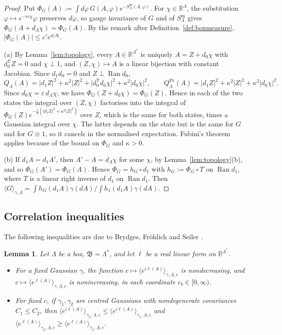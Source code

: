 \documentclass[11pt]{amsart}
\theoremstyle{plain}
\newtheorem{lemma}[theorem]{Lemma}
\theoremstyle{definition}
\theoremstyle{remark}
\numberwithin{equation}{section}
\newcommand{\R}{\mathbb{R}}
\newcommand{\eps}{\varepsilon}
\newcommand{\fB}{\mathfrak{B}}
\newcommand{\abs}[1]{\lvert #1\rvert}
\newcommand{\ev}[1]{\langle #1\rangle}
\newcommand{\Ran}{\operatorname{Ran}}
\begin{document}
\begin{proof}
Put $\Phi_G(A):=\int d\varphi\,G(A,\varphi)e^{-S^{\mathrm m}_\Lambda(A,\varphi)}$. For $\chi\in\R^\Lambda$, the substitution $\varphi\mapsto e^{-ie\chi}\varphi$ preserves $d\varphi$, so gauge invariance of $G$ and of $S^{\mathrm m}_\Lambda$ gives $\Phi_G(A+d_\Lambda\chi)=\Phi_G(A)$. By the remark after Definition~\ref{def:boxmeasure}, $\abs{\Phi_G(A)}\le c'e^{a\abs A}$.

(a) By Lemma~\ref{lem:topology}, every $A\in\R^{\Lambda^*}$ is uniquely $A=Z+d_0\chi$ with $d_0^{\mathsf T}Z=0$ and $\chi\perp1$, and $(Z,\chi)\mapsto A$ is a linear bijection with constant Jacobian. Since $d_1d_0=0$ and $Z\perp\Ran d_0$,
\[
Q_\Lambda(A)=\abs{d_1Z}^2+\kappa^2\abs Z^2+\abs{d_0^{\mathsf T}d_0\chi}^2+\kappa^2\abs{d_0\chi}^2,\qquad Q^{\mathrm{Pr}}_\Lambda(A)=\abs{d_1Z}^2+\kappa^2\abs Z^2+\kappa^2\abs{d_0\chi}^2 .
\]
Since $d_0\chi=\eps\,d_\Lambda\chi$, we have $\Phi_G(Z+d_0\chi)=\Phi_G(Z)$. Hence in each of the two states the integral over $(Z,\chi)$ factorises into the integral of $\Phi_G(Z)e^{-\frac\eps2(\abs{d_1Z}^2+\kappa^2\abs Z^2)}$ over $Z$, which is the same for both states, times a Gaussian integral over $\chi$. The latter depends on the state but is the same for $G$ and for $G\equiv1$, so it cancels in the normalised expectation. Fubini's theorem applies because of the bound on $\Phi_G$ and $\kappa>0$.

(b) If $d_1A=d_1A'$, then $A'-A=d_\Lambda\chi$ for some $\chi$, by Lemma~\ref{lem:topology}(b), and so $\Phi_G(A')=\Phi_G(A)$. Hence $\Phi_G=h_G\circ d_1$ with $h_G:=\Phi_G\circ T$ on $\Ran d_1$, where $T$ is a linear right inverse of $d_1$ on $\Ran d_1$. Then $\ev G_{\gamma,\Lambda}=\int h_G(d_1A)\gamma(dA)\big/\int h_1(d_1A)\gamma(dA)$.
\end{proof}

\subsection{Correlation inequalities}
The following inequalities are due to Brydges, Fr\"ohlich and Seiler \cite[Sect.~6]{BFS1}.

\begin{lemma}\label{lem:BFS}
Let $\Lambda$ be a box, $\fB=\Lambda^*$, and let $\ell$ be a real linear form on $\R^{\Lambda^*}$.
\begin{itemize}
\item[(a)] For a fixed Gaussian $\gamma$, the function $c\mapsto\ev{e^{i\ell(A)}}_{\gamma,\Lambda,c}$ is nondecreasing, and $c\mapsto\ev{e^{\ell(A)}}_{\gamma,\Lambda,c}$ is nonincreasing, in each coordinate $c_b\in[0,\infty)$.
\item[(b)] For fixed $c$, if $\gamma_1,\gamma_2$ are centred Gaussians with nondegenerate covariances $C_1\le C_2$, then $\ev{e^{i\ell(A)}}_{\gamma_2,\Lambda,c}\le\ev{e^{i\ell(A)}}_{\gamma_1,\Lambda,c}$ and $\ev{e^{\ell(A)}}_{\gamma_2,\Lambda,c}\ge\ev{e^{\ell(A)}}_{\gamma_1,\Lambda,c}$.
\end{itemize}
\end{lemma}
\end{document}
